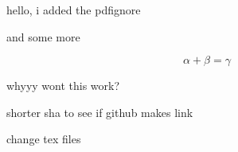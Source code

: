 \documentclass{article}
\begin{document}
hello, i added the pdfignore

and some more

$$\alpha + \beta = \gamma$$


whyyy wont this work?

shorter sha to see if github makes link

change tex files
\end{document}
